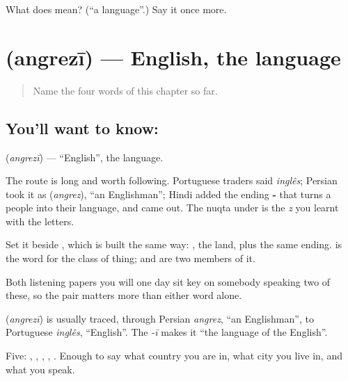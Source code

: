 \begin{tcolorbox}[breakable,colback=teal!4,colframe=teal!35!black,title={Before you move on}]
What does  mean? (\textquotedblleft{}a language\textquotedblright{}.) Say it once more.
\end{tcolorbox}
\section[\texorpdfstring{\hi{अंग्रेज़ी} (angrezī)}{अंग्रेज़ी (angrezī)}]{ (angrezī) — English, the language}

\label{lesson:HI-C68-english}



\begin{quote}
Name the four words of this chapter so far.
\end{quote}

\subsection*{You'll want to know: }
\textbf{} (\emph{angrezī}) — \textquotedblleft{}English\textquotedblright{}, the language.

The route is long and worth following. Portuguese traders said \emph{inglês}; Persian took it as  (\emph{angrez}), \textquotedblleft{}an Englishman\textquotedblright{}; Hindi added the ending \textbf{-} that turns a people into their language, and  came out. The nuqta under  is the \emph{z} you learnt with the letters.

Set it beside \textbf{}, which is built the same way: , the land, plus the same ending.  is the word for the class of thing;  and  are two members of it.

Both listening papers you will one day sit key on somebody speaking two of these, so the pair matters more than either word alone.

\begin{cousinweb}
\textbf{} (\emph{angrezī}) is usually traced, through Persian \emph{angrez}, \textquotedblleft{}an Englishman\textquotedblright{}, to Portuguese \emph{inglês}, \textquotedblleft{}English\textquotedblright{}. The \emph{-ī} makes it \textquotedblleft{}the language of the English\textquotedblright{}.
\end{cousinweb}

\begin{grammarlens}[title={What you've built}]
Five: , , , , . Enough to say what country you are in, what city you live in, and what you speak.
\end{grammarlens}

